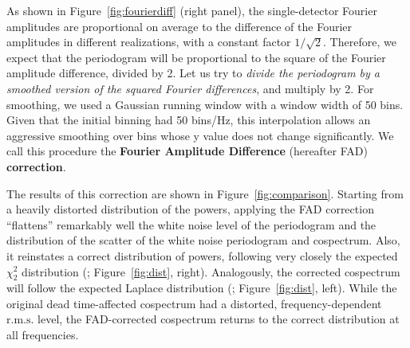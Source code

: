 \documentclass[twocolumn]{aastex61}
\newcommand{\rms}{\ensuremath{\mathrm{r.m.s.}}\xspace}
\begin{document}
As shown in Figure~\ref{fig:fourierdiff} (right panel), the single-detector Fourier amplitudes are proportional on average to the difference of the Fourier amplitudes in different realizations, with a constant factor $1/\sqrt{2}$.
Therefore, we expect that the periodogram will be proportional to the square of the Fourier amplitude difference, divided by 2.
Let us try to \textit{divide the periodogram by a smoothed version of the squared Fourier differences}, and multiply by 2.
For smoothing, we used a Gaussian running window with a window width of 50 bins.
Given that the initial binning had 50 bins/Hz, this interpolation allows an aggressive smoothing over bins whose y value does not change significantly.
We call this procedure the \textbf{Fourier Amplitude Difference} (hereafter FAD) \textbf{correction}.

The results of this correction are shown in Figure~\ref{fig:comparison}. 
Starting from a heavily distorted distribution of the powers, applying the FAD correction ``flattens'' remarkably well the white noise level of the periodogram and the distribution of the scatter of the white noise periodogram and cospectrum. 
Also, it reinstates a correct distribution of powers, following very closely the expected $\chi^2_2$ distribution (\citealt{Lewin+88}; Figure~\ref{fig:dist}, right). 
Analogously, the corrected cospectrum will follow the expected Laplace distribution (\citealt{HuppenkothenBachetti18}; Figure~\ref{fig:dist}, left).
While the original dead time-affected cospectrum had a distorted, frequency-dependent \rms level, the FAD-corrected cospectrum returns to the correct distribution at all frequencies.

\end{document}
